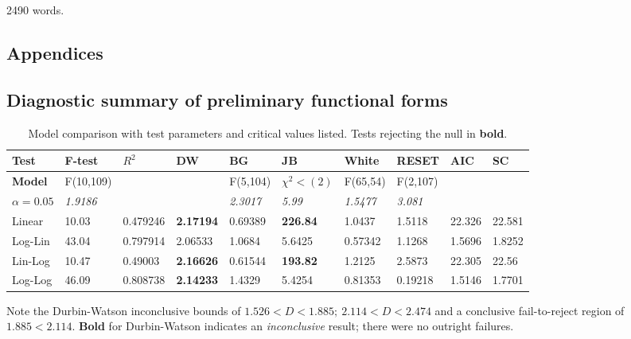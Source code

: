 \documentclass[12pt]{article}
\begin{document}
\\\\
2490 words.
\newpage
\printbibliography
\begin{landscape}
\section{Appendices} %
\label{sec:appendices}
\subsection{Diagnostic summary of preliminary functional forms} %
\label{sub:diagtestsumm}


\begin{table}[!htb]\caption{Model comparison with test parameters and critical values listed. Tests rejecting the null in \textbf{bold}.}
\begin{tabularx}{\linewidth}{X|XXXXXXXXX}
\textbf{Test}               & F-test  & \(R^2\)   & DW         & BG  & JB  & White   & RESET  & AIC         & SC          \\\hline
  \textbf{Model}  &       F(10,109)          &             &                       &         F(5,104)                 &        \(\chi^2 < (2)\)                                &        F(65,54)         &     F(2,107)           &             &           \\
\textit{\(\alpha = 0.05\)} & \textit{1.9186} &  &  & \textit{2.3017}          & \textit{5.99}                          & \textit{1.5477} & \textit{3.081} &  &  \\\hline\hline
Linear                      & 10.03           & 0.479246    & \textbf{2.17194}               & 0.69389                  & \textbf{226.84}                                 & 1.0437          & 1.5118         & 22.326      & 22.581      \\
Log-Lin                     & 43.04           & 0.797914    & 2.06533               & 1.0684                   & 5.6425                                 & 0.57342         & 1.1268         & 1.5696      & 1.8252      \\
Lin-Log                     & 10.47           & 0.49003     & \textbf{2.16626}               & 0.61544                  & \textbf{193.82}                                 & 1.2125          & 2.5873         & 22.305      & 22.56       \\
Log-Log                     & 46.09           & 0.808738    & \textbf{2.14233}               & 1.4329                   & 5.4254                                 & 0.81353         & 0.19218        & 1.5146      & 1.7701     
\end{tabularx}
\end{table} 
Note the Durbin-Watson inconclusive bounds of \(1.526 < D < 1.885; \: 2.114 < D < 2.474\) and a conclusive fail-to-reject region of \(1.885 < 2.114\). \textbf{Bold} for Durbin-Watson indicates an \emph{inconclusive} result; there were no outright failures.

\end{landscape}
\end{document}
